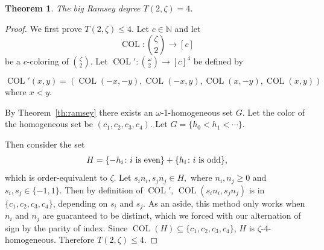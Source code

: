 \documentclass[10pt,a4paper]{article}
\newcommand{\om}{\omega}
\newcommand{\setconcat}{+}
\newcommand{\COL}{\operatorname{COL}}
\newcommand{\N}{\mathbb{N}}
\newcommand{\numcolors}{c}
\theoremstyle{plain}
\newtheorem{theorem}{Theorem}[section]
\theoremstyle{definition}
\begin{document}
\begin{theorem}\label{the:Z2}
The big Ramsey degree $T(2,\zeta)=4$. 
\end{theorem}
\begin{proof}
We first prove $T(2,\zeta)\leq 4$. Let $\numcolors \in \N$ and let $$\COL\colon \binom{\zeta}{2}\to [\numcolors]$$
be a $\numcolors$-coloring of $\binom{\zeta}{2}$.
Let $\COL'\colon \binom{\omega}{2} \to [\numcolors]^4$ be defined by 

$$
\COL'(x,y) = (\COL(-x,-y), \COL(-x,y), \COL(x,-y), \COL(x,y))
$$ where $x < y.$

By Theorem~\ref{th:ramsey} there exists an $\om$-1-homogeneous set $G$. 
Let the color of the homogeneous set be $(c_1,c_2,c_3,c_4)$.
Let $G = \{h_0 < h_1 < \cdots \}$. 

Then consider the set $$H= \{-h_i \colon i \textnormal{ is even}\} \setconcat \{h_i \colon i \textnormal{ is odd}\},$$ which is order-equivalent to $\zeta$. Let $s_in_i, s_jn_j \in H,$ where $n_i,n_j\geq 0$ and $s_i,s_j \in \{-1,1\}$. Then by definition of $\COL'$, $\COL(s_in_i,s_jn_j)$ is in $\{c_1, c_2, c_3, c_4\}$, depending on $s_i$ and $s_j$. As an aside, this method only works when $n_i$ and $n_j$ are guaranteed to be distinct, which we forced with our alternation of sign by the parity of index.
Since $\COL(H)\subseteq \{c_1,c_2,c_3,c_4\}$, $H$ is $\zeta$-4-homogeneous.
Therefore $T(2,\zeta)\leq 4$.


\end{proof}
\end{document}

